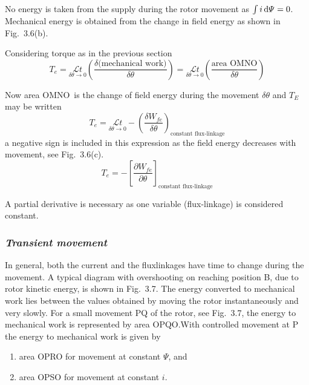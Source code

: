 \documentclass[a4paper,numbers=noenddot,12pt]{scrbook}
\begin{document}
            No energy is taken from the supply during the rotor movement as $\int i \dif \varPsi = 0$. Mechanical energy is obtained from the change in field energy as shown in Fig.\ 3.6(b).

            Considering torque as in the previous section 
            \begin{equation}
                T_e = \underset{\delta \theta \to 0}{\mathcal{L} t} \left(\dfrac{\delta \text{(mechanical work)}}{\delta \theta}\right) = \underset{\delta \theta \to 0}{\mathcal{L} t} \left(\dfrac{\text{area OMNO}}{\delta \theta}\right)
                \label{eq:Eq3.21}
            \end{equation}

            Now area OMNO\ is the change of field energy during the movement $\delta \theta$ and $T_E$ may be written 
            \begin{equation}
                T_e = \underset{\delta \theta \to 0}{\mathcal{L} t} - {\left( \dfrac{\delta W_{fe}}{\delta \theta}\right)}_{\text{constant flux-linkage}}
                \label{eq:Ee3.22}
            \end{equation}
            a negative sign is included in this expression as the field energy decreases with movement, see Fig.\ 3.6(c). 
            \begin{equation}
                T_e = - {\left[ \dfrac{\partial W_{fe}}{\partial \theta}\right]}_{\text{constant flux-linkage}}
                \label{eq_Eq3.23}
            \end{equation}

            A partial derivative is necessary as one variable (flux-linkage) is considered constant. 
            \subsubsection{\textit{Transient movement}}
            In general, both the current and the flux­linkages have time to change during the movement. A typical diagram with overshooting on reaching position B, due to rotor kinetic energy, is shown in Fig.\ 3.7. The energy converted to mechanical work lies between the values obtained by moving the rotor instantaneously and very slowly. 
            For a small movement PQ of the rotor, see Fig.\ 3.7, the energy to mechanical work is represented by area OPQO.\@ With controlled movement at P the energy to mechanical work is given by
            \begin{enumerate}[label={}]
                \item area OPRO for movement at constant $\varPsi$, and
                \item area OPSO for movement at constant $i$.
            \end{enumerate}
\end{document}
